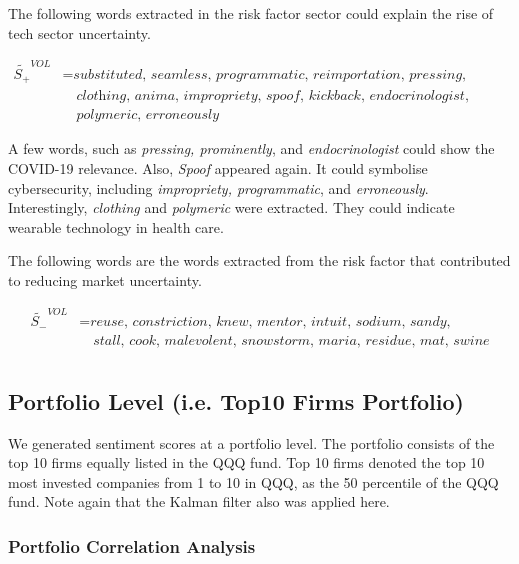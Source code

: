 \documentclass[logo,bsc,singlespacing,parskip]{infthesis}
\begin{document}
The following words extracted in the risk factor sector could explain the rise of tech sector uncertainty. 

\begin{align*}
\tilde{S_{+}}^{VOL} &= \textit{substituted, seamless, programmatic, reimportation, pressing, prominently} \\
               &\quad \textit{clothing, anima, impropriety, spoof, kickback, endocrinologist, educator,} \\
               &\quad \textit{polymeric, erroneously}
\end{align*}

A few words, such as \textit{pressing, prominently}, and \textit{endocrinologist} could show the COVID-19 relevance. Also, \textit{Spoof} appeared again. It could symbolise cybersecurity, including \textit{impropriety, programmatic}, and \textit{erroneously}. Interestingly, \textit{clothing} and \textit{polymeric} were extracted. They could indicate wearable technology in health care.

The following words are the words extracted from the risk factor that contributed to reducing market uncertainty. 

\begin{align*}
\tilde{S_{-}}^{VOL} &= \textit{reuse, constriction, knew, mentor, intuit, sodium, sandy, } \\
               &\quad \textit{stall, cook, malevolent, snowstorm, maria, residue, mat, swine} \\
\end{align*}




\subsection{Portfolio Level (i.e. Top10 Firms Portfolio)}
We generated sentiment scores at a portfolio level. The portfolio consists of the top 10 firms equally listed in the QQQ fund. Top 10 firms denoted the top 10 most invested companies from 1 to 10 in QQQ, as the 50 percentile of the QQQ fund. Note again that the Kalman filter also was applied here. 

\subsubsection{Portfolio Correlation Analysis}
\end{document}
